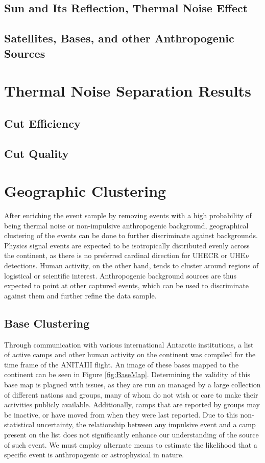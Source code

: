 	\subsection{Sun and Its Reflection, Thermal Noise Effect}
	\subsection{Satellites, Bases, and other Anthropogenic Sources}

\section{Thermal Noise Separation Results}
	\subsection{Cut Efficiency}
	\subsection{Cut Quality}




\section{Geographic Clustering}
	After enriching the event sample by removing events with a high probability of being thermal noise or non-impulsive anthropogenic background, geographical clustering of the events can be done to further discriminate against backgrounds. Physics signal events are expected to be isotropically distributed evenly across the continent, as there is no preferred cardinal direction for UHECR or UHE$\nu$ detections.  Human activity, on the other hand, tends to cluster around regions of logistical or scientific interest.  Anthropogenic background sources are thus expected to point at other captured events, which can be used to discriminate against them and further refine the data sample. 

	\subsection{Base Clustering}
		Through communication with various international Antarctic institutions, a list of active camps and other human activity on the continent was compiled for the time frame of the ANITAIII flight.  An image of these bases mapped to the continent can be seen in Figure \ref{fig:BaseMap}.  Determining the validity of this base map is plagued with issues, as they are run an managed by a large collection of different nations and groups, many of whom do not wish or care to make their activities publicly available.  Additionally, camps that are reported by groups may be inactive, or have moved from when they were last reported.  Due to this non-statistical uncertainty, the relationship between any impulsive event and a camp present on the list does not significantly enhance our understanding of the source of such event.  We must employ alternate means to estimate the likelihood that a specific event is anthropogenic or astrophysical in nature.
		
